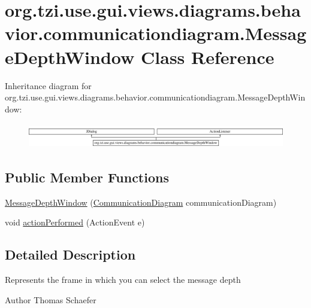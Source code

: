 \hypertarget{classorg_1_1tzi_1_1use_1_1gui_1_1views_1_1diagrams_1_1behavior_1_1communicationdiagram_1_1_message_depth_window}{\section{org.\-tzi.\-use.\-gui.\-views.\-diagrams.\-behavior.\-communicationdiagram.\-Message\-Depth\-Window Class Reference}
\label{classorg_1_1tzi_1_1use_1_1gui_1_1views_1_1diagrams_1_1behavior_1_1communicationdiagram_1_1_message_depth_window}
}
Inheritance diagram for org.\-tzi.\-use.\-gui.\-views.\-diagrams.\-behavior.\-communicationdiagram.\-Message\-Depth\-Window\-:\begin{figure}[H]
\begin{center}
\leavevmode
\includegraphics[height=1.100196cm]{classorg_1_1tzi_1_1use_1_1gui_1_1views_1_1diagrams_1_1behavior_1_1communicationdiagram_1_1_message_depth_window}
\end{center}
\end{figure}
\subsection*{Public Member Functions}
\begin{DoxyCompactItemize}
\item 
\hyperlink{classorg_1_1tzi_1_1use_1_1gui_1_1views_1_1diagrams_1_1behavior_1_1communicationdiagram_1_1_message_depth_window_aa67065ed9fcfd0cc94c5b08fb288b119}{Message\-Depth\-Window} (\hyperlink{classorg_1_1tzi_1_1use_1_1gui_1_1views_1_1diagrams_1_1behavior_1_1communicationdiagram_1_1_communication_diagram}{Communication\-Diagram} communication\-Diagram)
\item 
void \hyperlink{classorg_1_1tzi_1_1use_1_1gui_1_1views_1_1diagrams_1_1behavior_1_1communicationdiagram_1_1_message_depth_window_acff6f024639b65924435694a498c1994}{action\-Performed} (Action\-Event e)
\end{DoxyCompactItemize}


\subsection{Detailed Description}
Represents the frame in which you can select the message depth \begin{DoxyAuthor}{Author}
Thomas Schaefer 
\end{DoxyAuthor}


